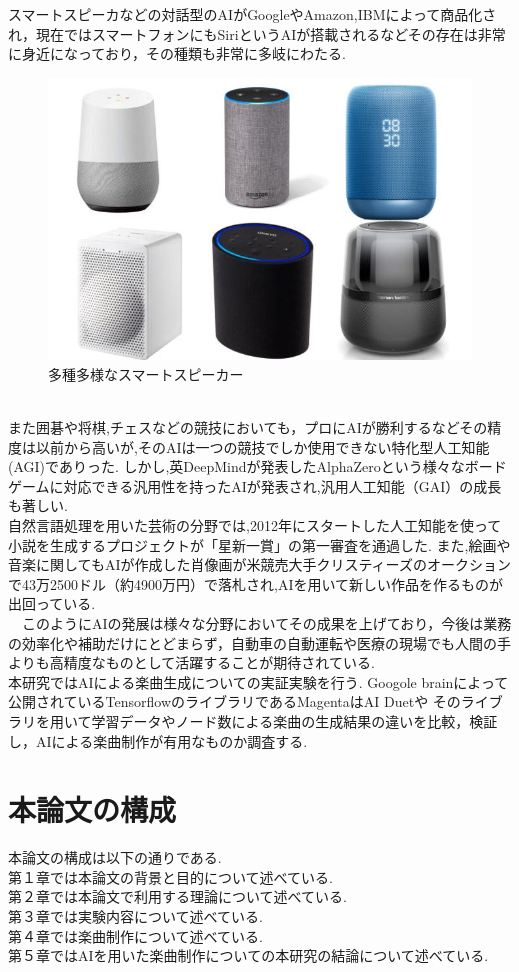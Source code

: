 スマートスピーカなどの対話型のAIがGoogleやAmazon,IBMによって商品化され，現在ではスマートフォンにもSiriというAIが搭載されるなどその存在は非常に身近になっており，その種類も非常に多岐にわたる.
\begin{figure}[!ht]
    \begin{screen}
    \begin{center}
        \includegraphics[scale=0.6, clip]{./img/smartspeaker_list.jpg}
        \caption{多種多様なスマートスピーカー}
        \label{fig:多種多様なスマートスピーカー}
    \end{center}
\end{screen}
\end{figure}\\
また囲碁や将棋,チェスなどの競技においても，プロにAIが勝利するなどその精度は以前から高いが,そのAIは一つの競技でしか使用できない特化型人工知能(AGI)でありった.
しかし,英DeepMindが発表したAlphaZeroという様々なボードゲームに対応できる汎用性を持ったAIが発表され,汎用人工知能（GAI）の成長も著しい.\\
自然言語処理を用いた芸術の分野では,2012年にスタートした人工知能を使って小説を生成するプロジェクトが「星新一賞」の第一審査を通過した.
また,絵画や音楽に関してもAIが作成した肖像画が米競売大手クリスティーズのオークションで43万2500ドル（約4900万円）で落札され,AIを用いて新しい作品を作るものが出回っている.\\
　このようにAIの発展は様々な分野においてその成果を上げており，今後は業務の効率化や補助だけにとどまらず，自動車の自動運転や医療の現場でも人間の手よりも高精度なものとして活躍することが期待されている.\\
本研究ではAIによる楽曲生成についての実証実験を行う.
Googole brainによって公開されているTensorflowのライブラリであるMagentaはAI Duetや
そのライブラリを用いて学習データやノード数による楽曲の生成結果の違いを比較，検証し，AIによる楽曲制作が有用なものか調査する.\\
\section{本論文の構成}
本論文の構成は以下の通りである.\\
第１章では本論文の背景と目的について述べている.\\
第２章では本論文で利用する理論について述べている.\\
第３章では実験内容について述べている.\\
第４章では楽曲制作について述べている.\\
第５章ではAIを用いた楽曲制作についての本研究の結論について述べている.\\